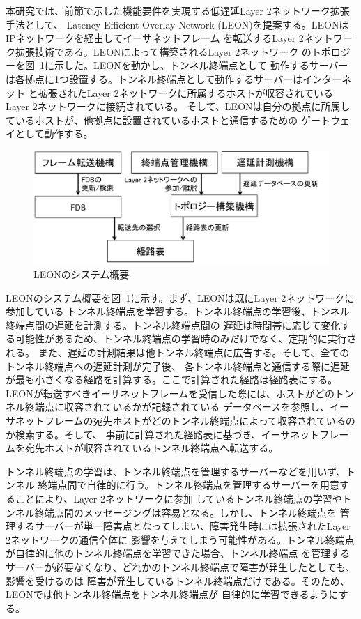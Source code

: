 本研究では、前節で示した機能要件を実現する低遅延Layer 2ネットワーク拡張手法として、
Latency Efficient Overlay Network (LEON)を提案する。LEONはIPネットワークを経由してイーサネットフレーム
を転送するLayer 2ネットワーク拡張技術である。LEONによって構築されるLayer 2ネットワーク
のトポロジーを図~\ref{img:mtuntopology}に示した。LEONを動かし、トンネル終端点として
動作するサーバーは各拠点に1つ設置する。トンネル終端点として動作するサーバーはインターネット
と拡張されたLayer 2ネットワークに所属するホストが収容されているLayer 2ネットワークに接続されている。
そして、LEONは自分の拠点に所属しているホストが、他拠点に設置されているホストと通信するための
ゲートウェイとして動作する。

\begin{figure}
	\begin{center}
		\includegraphics[scale=0.65]{./img/mtunworks}
		\caption{LEONのシステム概要}
		\label{img:mtuntopology}
	\end{center}
\end{figure}

LEONのシステム概要を図~\ref{img:mtuntopology}に示す。まず、LEONは既にLayer 2ネットワークに参加している
トンネル終端点を学習する。トンネル終端点の学習後、トンネル終端点間の遅延を計測する。トンネル終端点間の
遅延は時間帯に応じて変化する可能性があるため、トンネル終端点の学習時のみだけでなく、定期的に実行される。
また、遅延の計測結果は他トンネル終端点に広告する。そして、全てのトンネル終端点への遅延計測が完了後、
各トンネル終端点と通信する際に遅延が最も小さくなる経路を計算する。ここで計算された経路は経路表にする。
LEONが転送すべきイーサネットフレームを受信した際には、ホストがどのトンネル終端点に収容されているかが記録されている
データベースを参照し、イーサネットフレームの宛先ホストがどのトンネル終端点によって収容されているのか検索する。そして、
事前に計算された経路表に基づき、イーサネットフレームを宛先ホストが収容されているトンネル終端点へ転送する。

トンネル終端点の学習は、トンネル終端点を管理するサーバーなどを用いず、トンネル
終端点間で自律的に行う。トンネル終端点を管理するサーバーを用意することにより、Layer 2ネットワークに参加
しているトンネル終端点の学習やトンネル終端点間のメッセージングは容易となる。しかし、トンネル終端点を
管理するサーバーが単一障害点となってしまい、障害発生時には拡張されたLayer 2ネットワークの通信全体に
影響を与えてしまう可能性がある。トンネル終端点が自律的に他のトンネル終端点を学習できた場合、トンネル終端点
を管理するサーバーが必要なくなり、どれかのトンネル終端点で障害が発生したとしても、影響を受けるのは
障害が発生しているトンネル終端点だけである。そのため、LEONでは他トンネル終端点をトンネル終端点が
自律的に学習できるようにする。

